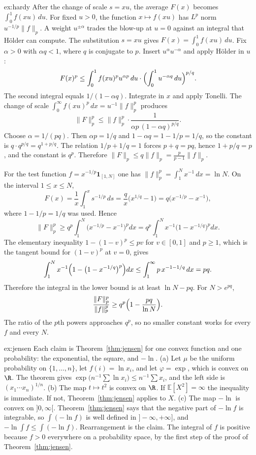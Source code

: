 \begin{solution}{ex:hardy}
\idea After the change of scale $s=xu$, the average $F(x)$ becomes $\int_0^1 f(xu)\,du$. For fixed $u>0$, the function $x\mapsto f(xu)$ has $L^p$ norm $u^{-1/p}\|f\|_p$. A weight $u^{\pm\alpha}$ trades the blow-up at $u=0$ against an integral that Hölder can compute.
\writeup The substitution $s=xu$ gives $F(x)=\int_0^1 f(xu)\,du$. Fix $\alpha>0$ with $\alpha q<1$, where $q$ is conjugate to $p$. Insert $u^{\alpha}u^{-\alpha}$ and apply Hölder in $u$:
\[F(x)^p\le\int_0^1 f(xu)^p u^{\alpha p}\,du\cdot\Bigl(\int_0^1 u^{-\alpha q}\,du\Bigr)^{p/q}.\]
The second integral equals $1/(1-\alpha q)$. Integrate in $x$ and apply Tonelli. The change of scale $\int_0^\infty f(xu)^p\,dx=u^{-1}\|f\|_p^p$ produces
\[\|F\|_p^p\le\|f\|_p^p\cdot\frac1{\alpha p\,(1-\alpha q)^{p/q}}.\]
Choose $\alpha=1/(pq)$. Then $\alpha p=1/q$ and $1-\alpha q=1-1/p=1/q$, so the constant is $q\cdot q^{p/q}=q^{1+p/q}$. The relation $1/p+1/q=1$ forces $p+q=pq$, hence $1+p/q=p$, and the constant is $q^p$. Therefore $\|F\|_p\le q\|f\|_p=\frac{p}{p-1}\|f\|_p$.

For the test function $f=x^{-1/p}\mathbf 1_{[1,N]}$ one has $\|f\|_p^p=\int_1^N x^{-1}\,dx=\ln N$. On the interval $1\le x\le N$,
\[F(x)=\frac1x\int_1^x s^{-1/p}\,ds=\frac qx\bigl(x^{1/q}-1\bigr)=q\bigl(x^{-1/p}-x^{-1}\bigr),\]
where $1-1/p=1/q$ was used. Hence
\[\|F\|_p^p\ge q^p\int_1^N\bigl(x^{-1/p}-x^{-1}\bigr)^p dx=q^p\int_1^N x^{-1}\bigl(1-x^{-1/q}\bigr)^p dx.\]
The elementary inequality $1-(1-v)^p\le pv$ for $v\in[0,1]$ and $p\ge1$, which is the tangent bound for $(1-v)^p$ at $v=0$, gives
\[\int_1^N x^{-1}\Bigl(1-\bigl(1-x^{-1/q}\bigr)^p\Bigr)dx\le\int_1^\infty p\,x^{-1-1/q}\,dx=pq.\]
Therefore the integral in the lower bound is at least $\ln N-pq$. For $N>e^{pq}$,
\[\frac{\|F\|_p^p}{\|f\|_p^p}\ge q^p\Bigl(1-\frac{pq}{\ln N}\Bigr).\]
The ratio of the $p$th powers approaches $q^p$, so no smaller constant works for every $f$ and every $N$.
\end{solution}

\begin{solution}{ex:jensen}
\idea Each claim is Theorem~\ref{thm:jensen} for one convex function and one probability: the exponential, the square, and $-\ln$.
\writeup (a) Let $\mu$ be the uniform probability on $\{1,\dots,n\}$, let $f(i)=\ln x_i$, and let $\varphi=\exp$, which is convex on $\R$. The theorem gives $\exp\bigl(n^{-1}\sum\ln x_i\bigr)\le n^{-1}\sum x_i$, and the left side is $(x_1\cdots x_n)^{1/n}$. (b) The map $t\mapsto t^2$ is convex on $\R$. If $\mathbb E[X^2]=\infty$ the inequality is immediate. If not, Theorem~\ref{thm:jensen} applies to $X$. (c) The map $-\ln$ is convex on $]0,\infty[$. Theorem~\ref{thm:jensen} says that the negative part of $-\ln f$ is integrable, so $\int(-\ln f)$ is well defined in $]-\infty,+\infty]$, and $-\ln\int f\le\int(-\ln f)$. Rearrangement is the claim. The integral of $f$ is positive because $f>0$ everywhere on a probability space, by the first step of the proof of Theorem~\ref{thm:jensen}.
\end{solution}

